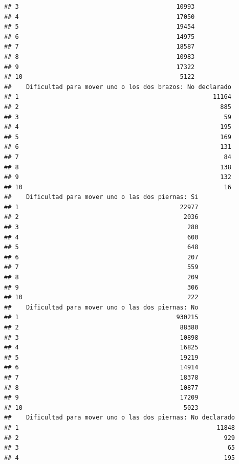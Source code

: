 \documentclass[11pt,]{article}
\begin{document}
\begin{verbatim}
## 3                                           10993
## 4                                           17050
## 5                                           19454
## 6                                           14975
## 7                                           18587
## 8                                           10983
## 9                                           17322
## 10                                           5122
##    Dificultad para mover uno o los dos brazos: No declarado
## 1                                                     11164
## 2                                                       885
## 3                                                        59
## 4                                                       195
## 5                                                       169
## 6                                                       131
## 7                                                        84
## 8                                                       138
## 9                                                       132
## 10                                                       16
##    Dificultad para mover uno o las dos piernas: Si
## 1                                            22977
## 2                                             2036
## 3                                              280
## 4                                              600
## 5                                              648
## 6                                              207
## 7                                              559
## 8                                              209
## 9                                              306
## 10                                             222
##    Dificultad para mover uno o las dos piernas: No
## 1                                           930215
## 2                                            88380
## 3                                            10898
## 4                                            16825
## 5                                            19219
## 6                                            14914
## 7                                            18378
## 8                                            10877
## 9                                            17209
## 10                                            5023
##    Dificultad para mover uno o las dos piernas: No declarado
## 1                                                      11848
## 2                                                        929
## 3                                                         65
## 4                                                        195

\end{verbatim}
\end{document}
